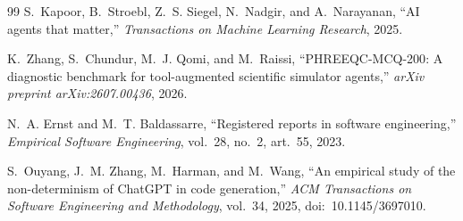 \documentclass[10pt,conference]{IEEEtran}
\begin{document}
\begin{thebibliography}{99}
S.~Kapoor, B.~Stroebl, Z.~S. Siegel, N.~Nadgir, and A.~Narayanan, ``{AI}
agents that matter,'' \emph{Transactions on Machine Learning Research},
2025.

K.~Zhang, S.~Chundur, M.~J. Qomi, and M.~Raissi, ``{PHREEQC-MCQ-200}: A
diagnostic benchmark for tool-augmented scientific simulator agents,''
\emph{arXiv preprint arXiv:2607.00436}, 2026.

N.~A. Ernst and M.~T. Baldassarre, ``Registered reports in software
engineering,'' \emph{Empirical Software Engineering}, vol.~28, no.~2,
art.~55, 2023.

S.~Ouyang, J.~M. Zhang, M.~Harman, and M.~Wang, ``An empirical study of the
non-determinism of {ChatGPT} in code generation,'' \emph{ACM Transactions on
Software Engineering and Methodology}, vol.~34, 2025,
doi:~10.1145/3697010.
\end{thebibliography}
\end{document}
